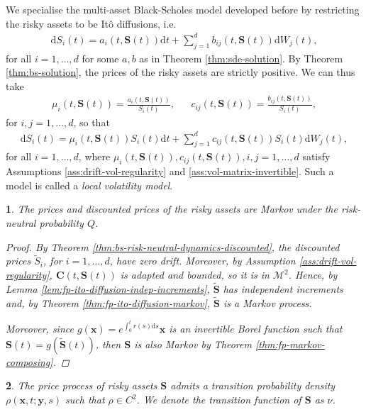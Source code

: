 \documentclass[english]{article}
\numberwithin{equation}{section}
\numberwithin{figure}{section}
\theoremstyle{bolddescit}
\newtheorem{theorem}{\protect\theoremname}[section]
\theoremstyle{definition}
\theoremstyle{definition}
\theoremstyle{plain}
\theoremstyle{plain}
\theoremstyle{bolddesc}
\newtheorem{assumption}[theorem]{\protect\assumptionname}
\theoremstyle{plain}
\theoremstyle{remark}
\providecommand{\assumptionname}{Assumption}
\providecommand{\theoremname}{Theorem}
\begin{document}
We specialise the multi-asset Black-Scholes model developed before by restricting the risky assets to be It\^o diffusions, i.e.
\begin{align*}
  \mathrm{d}S_i(t) = a_i(t,\mathbf{S}(t)) \mathrm{d}t + \sum_{j=1}^{d} b_{ij}(t,\mathbf{S}(t)) \mathrm{d}W_j(t),
\end{align*}
for all $i=1,\ldots,d$ for some $a,b$ as in Theorem \ref{thm:sde-solution}. By Theorem \ref{thm:bs-solution}, the prices of the risky assets are strictly positive. We can thus take
\begin{align*}
  \mu_i(t,\mathbf{S}(t)) = \frac{a_i(t, \mathbf{S}(t))}{S_i(t)},
  && c_{ij}(t,\mathbf{S}(t)) = \frac{b_{ij}(t, \mathbf{S}(t))}{S_i(t)},
\end{align*}
for $i,j=1,\ldots,d$, so that
\begin{align*}
  \mathrm{d}S_i(t) = \mu_i(t,\mathbf{S}(t)) S_i(t) \mathrm{d}t + \sum_{j=1}^{d} c_{ij}(t,\mathbf{S}(t)) S_i(t) \mathrm{d}W_j(t),
\end{align*}
for all $i=1,\ldots,d$, where $\mu_i(t,\mathbf{S}(t)), c_{ij}(t,\mathbf{S}(t)), i,j=1,\ldots,d$ satisfy Assumptions \ref{ass:drift-vol-regularity} and \ref{ass:vol-matrix-invertible}. Such a model is called a \textit{local volatility model}.

\begin{theorem}\label{thm:local-stock-prices-markov}
  The prices and discounted prices of the risky assets are Markov under the risk-neutral probability $Q$.

  \begin{proof}
    By Theorem \ref{thm:bs-risk-neutral-dynamics-discounted}, the discounted prices $\widetilde{S}_i$, for $i=1,\ldots,d$, have zero drift. Moreover, by Assumption \ref{ass:drift-vol-regularity}, $\mathbf{C}(t,\mathbf{S}(t))$ is adapted and bounded, so it is in $\mathcal{M}^2$. Hence, by Lemma \ref{lem:fp-ito-diffusion-indep-increments}, $\widetilde{\mathbf{S}}$ has independent increments and, by Theorem \ref{thm:fp-ito-diffusion-markov}, $\widetilde{\mathbf{S}}$ is a Markov process.

    Moreover, since $g(\mathbf{x}) = e^{\int_0^t r(s) \mathrm{d}s} \mathbf{x}$ is an invertible Borel function such that $\mathbf{S}(t) = g(\widetilde{\mathbf{S}}(t))$, then $\mathbf{S}$ is also Markov by Theorem \ref{thm:fp-markov-composing}.
  \end{proof}
\end{theorem}

\begin{assumption}\label{ass:local-density}
  The price process of risky assets $\mathbf{S}$ admits a transition probability density $\rho(\mathbf{x},t;\mathbf{y},s)$ such that $\rho \in C^2$. We denote the transition function of $\mathbf{S}$ as $\nu$.
\end{assumption}
\end{document}
